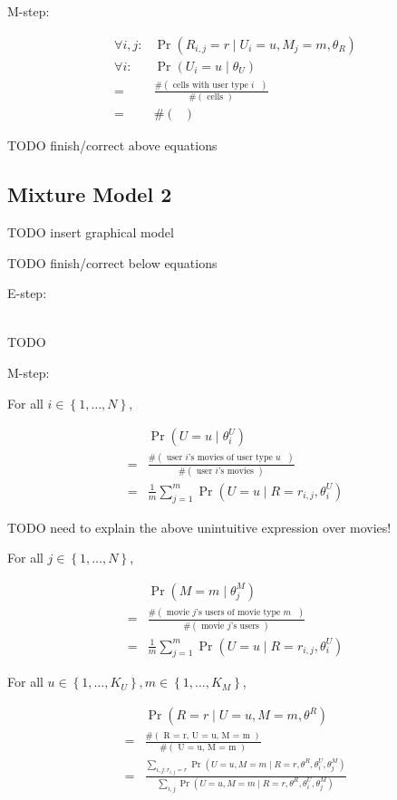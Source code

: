 \documentclass{article}
\newcommand{\PO}[1]{{ \Pr \left( #1 \right) }}
\newcommand{\PP}[2]{{ \PO{ #1 \mid #2 } }}
\newcommand{\N}[1]{{ \# \left( \textrm{ #1 } \right) }}
\newcommand{\range}[1]{{ \left\{ 1, \dots, #1 \right\} }}
\begin{document}
M-step:

\begin{align*}
\forall i,j: &
\PP{ R_{i,j} = r }{ U_i = u, M_j = m, \theta_R } \\
\forall i: &
\PP{ U_i = u }{ \theta_U } \\
=& \frac{
  \N{cells with user type $i$}
}{
  \N{cells}
}\\
=& \N{}
\end{align*}

TODO finish/correct above equations

\subsection{Mixture Model 2}

TODO insert graphical model

TODO finish/correct below equations

E-step:

\begin{align*}
\end{align*}

TODO

M-step:

For all $i \in \range{N}$,

\begin{align*}
  & \PP{ U = u }{ \theta^U_i } \\
  =& \frac{ \N{user $i$'s movies of user type $u$} }{ \N{user
      $i$'s movies} } \\
  =& \frac{1}{m} \sum_{j=1}^m \PP{ U = u }{ R = r_{i,j}, \theta^U_i }
\end{align*}

TODO need to explain the above unintuitive expression over movies!

For all $j \in \range{N}$,

\begin{align*}
  & \PP{ M = m }{ \theta^M_j } \\
  =& \frac{ \N{movie $j$'s users of movie type $m$} }{ \N{movie $j$'s users} } \\
  =& \frac{1}{m} \sum_{j=1}^m \PP{ U = u }{ R = r_{i,j}, \theta^U_i }
\end{align*}

For all $u \in \range{K_U}, m \in \range{K_M}$,

\begin{align*}
& \PP{ R = r }{ U = u, M = m, \theta^R } \\
=& \frac{
  \N{R = r, U = u, M = m}
}{
  \N{U = u, M = m}
} \\
=& \frac{
  \sum_{i,j: r_{i,j} = r}
  \PP{U = u, M = m}{R = r, \theta^R, \theta^U_i, \theta^M_j }
}{
  \sum_{i,j}
  \PP{U = u, M = m}{R = r, \theta^R, \theta^U_i, \theta^M_j }
}
\end{align*}
\end{document}
